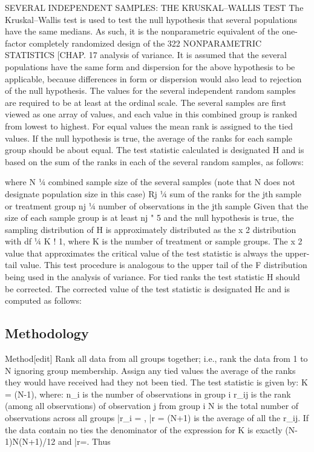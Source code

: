SEVERAL INDEPENDENT SAMPLES: THE KRUSKAL–WALLIS TEST
The Kruskal–Wallis test is used to test the null hypothesis that several populations have the same
medians. As such, it is the nonparametric equivalent of the one-factor completely randomized design of the
322 NONPARAMETRIC STATISTICS [CHAP. 17
analysis of variance. It is assumed that the several populations have the same form and dispersion for the
above hypothesis to be applicable, because differences in form or dispersion would also lead to rejection of
the null hypothesis. The values for the several independent random samples are required to be at least at the
ordinal scale.
The several samples are first viewed as one array of values, and each value in this combined group is
ranked from lowest to highest. For equal values the mean rank is assigned to the tied values. If the null
hypothesis is true, the average of the ranks for each sample group should be about equal. The test statistic
calculated is designated H and is based on the sum of the ranks in each of the several random samples, as
follows:

where N ¼ combined sample size of the several samples
(note that N does not designate population size in this case)
Rj ¼ sum of the ranks for the jth sample or treatment group
nj ¼ number of observations in the jth sample
Given that the size of each sample group is at least nj " 5 and the null hypothesis is true, the sampling
distribution of H is approximately distributed as the x
2 distribution with df ¼ K ! 1, where K is the number
of treatment or sample groups. The x
2 value that approximates the critical value of the test statistic is
always the upper-tail value. This test procedure is analogous to the upper tail of the F distribution being
used in the analysis of variance.
For tied ranks the test statistic H should be corrected. The corrected value of the test statistic is designated
Hc and is computed as follows:

\subsection*{Methodology}
Method[edit]
Rank all data from all groups together; i.e., rank the data from 1 to N ignoring group membership. Assign any tied values the average of the ranks they would have received had they not been tied.
The test statistic is given by:
K = (N-1), where:
n_i is the number of observations in group i
r_{ij} is the rank (among all observations) of observation j from group i
N is the total number of observations across all groups
\bar{r}_{i\cdot} = ,
\bar{r} = (N+1) is the average of all the r_{ij}.
If the data contain no ties the denominator of the expression for K is exactly (N-1)N(N+1)/12 and \bar{r}=. Thus


